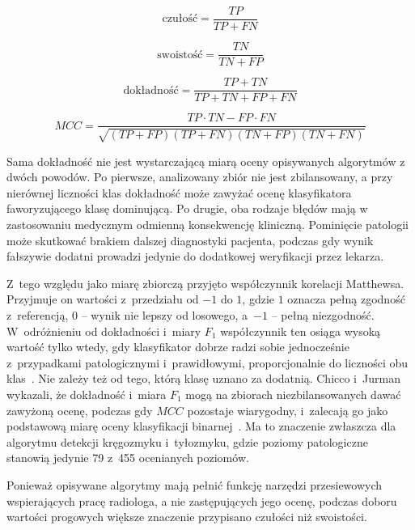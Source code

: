 \begin{equation} \label{eq:czulosc}
    \text{czułość} = \frac{TP}{TP + FN}
\end{equation}

\begin{equation} \label{eq:swoistosc}
    \text{swoistość} = \frac{TN}{TN + FP}
\end{equation}

\begin{equation} \label{eq:dokladnosc}
    \text{dokładność} = \frac{TP + TN}{TP + TN + FP + FN}
\end{equation}

\begin{equation} \label{eq:mcc}
    MCC = \frac{TP \cdot TN - FP \cdot FN}{\sqrt{(TP + FP)(TP + FN)(TN + FP)(TN + FN)}}
\end{equation}

Sama dokładność nie jest wystarczającą miarą oceny opisywanych algorytmów z dwóch powodów. Po pierwsze, analizowany zbiór nie jest zbilansowany, a przy nierównej liczności klas dokładność może zawyżać ocenę klasyfikatora faworyzującego klasę dominującą. Po drugie, oba rodzaje błędów mają w zastosowaniu medycznym odmienną konsekwencję kliniczną. Pominięcie patologii może skutkować brakiem dalszej diagnostyki pacjenta, podczas gdy wynik fałszywie dodatni prowadzi jedynie do dodatkowej weryfikacji przez lekarza.

Z~tego względu jako miarę zbiorczą przyjęto współczynnik korelacji Matthewsa.
Przyjmuje on wartości z~przedziału od $-1$ do $1$, gdzie $1$ oznacza pełną zgodność z~referencją, $0$ -- wynik nie lepszy od losowego, a~$-1$ -- pełną niezgodność.
W~odróżnieniu od dokładności i~miary $F_1$ współczynnik ten osiąga wysoką wartość tylko wtedy, gdy klasyfikator dobrze radzi sobie jednocześnie z~przypadkami patologicznymi i~prawidłowymi, proporcjonalnie do liczności obu klas~\cite{chicco_mcc}.
Nie zależy też od tego, którą klasę uznano za dodatnią.
Chicco i~Jurman wykazali, że dokładność i~miara $F_1$ mogą na zbiorach niezbilansowanych dawać zawyżoną ocenę, podczas gdy $MCC$ pozostaje wiarygodny, i~zalecają go jako podstawową miarę oceny klasyfikacji binarnej~\cite{chicco_mcc}.
Ma to znaczenie zwłaszcza dla algorytmu detekcji kręgozmyku i~tyłozmyku, gdzie poziomy patologiczne stanowią jedynie 79 z~455 ocenianych poziomów.

Ponieważ opisywane algorytmy mają pełnić funkcję narzędzi przesiewowych wspierających pracę radiologa, a nie zastępujących jego ocenę, podczas doboru wartości progowych większe znaczenie przypisano czułości niż swoistości.

